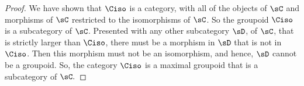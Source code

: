 \documentclass[main.tex]{subfiles}
\begin{document}
\begin{proof}
		We have shown that \(\Ciso\) is a category, with all of the objects of
		\(\sC\) and morphisms of \(\sC\) restricted to the isomorphisms of
		\(\sC\). So the groupoid \(\Ciso\) is a
		subcategory of \(\sC\). Presented with any other subcategory \(\sD\), of \(\sC\), that is
		strictly larger than \(\Ciso\), there must be a morphism in \(\sD\) that is
		not in \(\Ciso\). Then this morphism must not be an isomorphism, and
		hence, \(\sD\) cannot be a groupoid. So, the category \(\Ciso\) is a maximal
		groupoid that is a subcategory of \(\sC.\)
	\end{proof}
\end{document}
